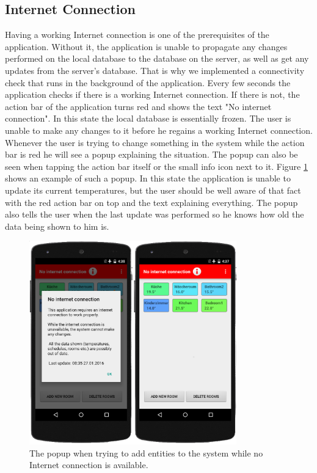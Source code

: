 \subsection{Internet Connection}

Having a working Internet connection is one of the prerequisites of the application. Without it, the application is unable to propagate any changes performed on the local database to the database on the server, as well as get any updates from the server's database. That is why we implemented a connectivity check that runs in the background of the application. Every few seconds the application checks if there is a working Internet connection.
If there is not, the action bar of the application turns red and shows the text "No internet connection". In this state the local database is essentially frozen. The user is unable to make any changes to it before he regains a working Internet connection. Whenever the user is trying to change something in the system while the action bar is red he will see a popup explaining the situation.
The popup can also be seen when tapping the action bar itself or the small info icon next to it. Figure \ref{fig:no_internet} shows an example of such a popup. In this state the application is unable to update its current temperatures, but the user should be well aware of that fact with the red action bar on top and the text explaining everything. The popup also tells the user when the last update was performed so he knows how old the data being shown to him is. 

\begin{figure}
	\begin{center}
		\includegraphics[width=0.8\textwidth]{images/no_internet.png}
	\end{center}
	\caption{The popup when trying to add entities to the system while no Internet connection is available.}
	\label{fig:no_internet}
\end{figure}

